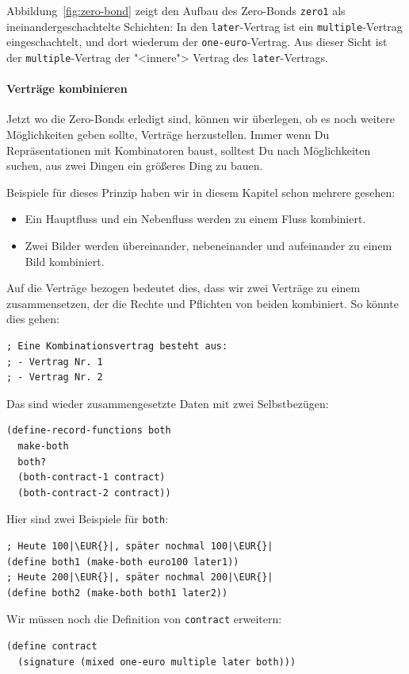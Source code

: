 \noindent Abbildung~\ref{fig:zero-bond} zeigt den Aufbau des
Zero-Bonds \lstinline{zero1} als ineinandergeschachtelte Schichten:
In den \lstinline{later}-Vertrag ist ein \lstinline{multiple}-Vertrag
eingeschachtelt, und dort wiederum der \lstinline{one-euro}-Vertrag.
Aus dieser Sicht ist der \lstinline{multiple}-Vertrag der
"<innere"> Vertrag des \lstinline{later}-Vertrags.

\paragraph{Verträge kombinieren}

Jetzt wo die Zero-Bonds erledigt sind, können wir überlegen, ob es
noch weitere Möglichkeiten geben sollte, Verträge herzustellen.  Immer
wenn Du Repräsentationen mit Kombinatoren baust, solltest Du nach
Möglichkeiten suchen, aus zwei Dingen ein größeres Ding zu bauen.

Beispiele für dieses Prinzip haben wir in diesem Kapitel schon mehrere
gesehen:
%
\begin{itemize}
\item Ein Hauptfluss und ein Nebenfluss werden zu einem Fluss
  kombiniert.
\item Zwei Bilder werden übereinander, nebeneinander und aufeinander
  zu einem Bild kombiniert.
\end{itemize}
%
Auf die Verträge bezogen bedeutet dies, dass wir zwei Verträge
zu einem zusammensetzen, der die Rechte und Pflichten von beiden kombiniert.
So könnte dies gehen:
%
\begin{lstlisting}
; Eine Kombinationsvertrag besteht aus:
; - Vertrag Nr. 1
; - Vertrag Nr. 2
\end{lstlisting}
%
Das sind wieder zusammengesetzte Daten mit zwei Selbstbezügen:
%
\begin{lstlisting}
(define-record-functions both
  make-both
  both?
  (both-contract-1 contract)
  (both-contract-2 contract))
\end{lstlisting}
%
Hier sind zwei Beispiele für \lstinline{both}:
%
\begin{lstlisting}
; Heute 100|\EUR{}|, später nochmal 100|\EUR{}|
(define both1 (make-both euro100 later1))
; Heute 200|\EUR{}|, später nochmal 200|\EUR{}|
(define both2 (make-both both1 later2))
\end{lstlisting}
%
Wir müssen noch die Definition von \lstinline{contract} erweitern:
%
\begin{lstlisting}
(define contract
  (signature (mixed one-euro multiple later both)))
\end{lstlisting}
%

